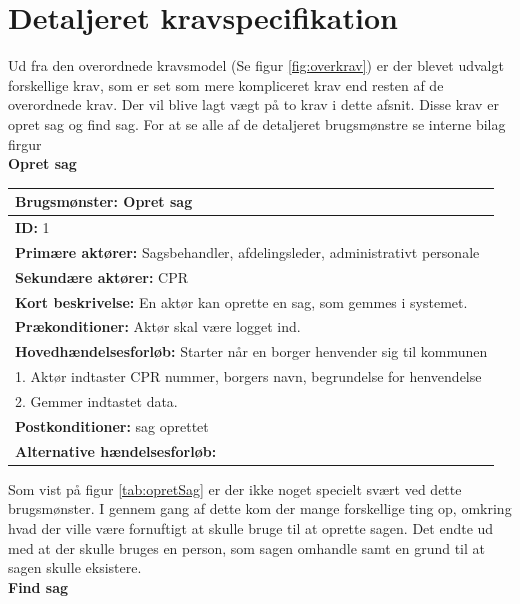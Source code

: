 \section{Detaljeret kravspecifikation}
Ud fra den overordnede kravsmodel (Se figur \ref{fig:overkrav}) er der blevet udvalgt forskellige krav, som er set som mere kompliceret krav end resten af de overordnede krav. Der vil blive lagt vægt på to krav i dette afsnit. Disse krav er opret sag og find sag. For at se alle af de detaljeret brugsmønstre se interne bilag firgur \\
\textbf{Opret sag} \\
\begin{center} \label{tab:opretSag}
\begin{longtable}{|p{18cm}|}
\hline
\textbf{Brugsmønster: }Opret sag \\
\hline
\textbf{ID: }1 \\
\hline
\textbf{Primære aktører: }Sagsbehandler, afdelingsleder, administrativt personale\\
\hline
\textbf{Sekundære aktører: }CPR\\
\hline
\textbf{Kort beskrivelse: }En aktør kan oprette en sag, som gemmes i systemet. \\
\hline
\textbf{Prækonditioner: }Aktør skal være logget ind.\\
\hline
\textbf{Hovedhændelsesforløb: }\newline 
Starter når en borger henvender sig til kommunen \\
1. Aktør indtaster CPR nummer, borgers navn, begrundelse for henvendelse \\
2. Gemmer indtastet data.	
\\
\hline
\textbf{Postkonditioner: }sag oprettet\\
\hline
\textbf{Alternative hændelsesforløb: }\\
\hline
\end{longtable}
\end{center}
Som vist på figur \ref{tab:opretSag} er der ikke noget specielt svært ved dette brugsmønster. I gennem gang af dette kom der mange forskellige ting op, omkring hvad der ville være fornuftigt at skulle bruge til at oprette sagen. Det endte ud med at der skulle bruges en person, som sagen omhandle samt en grund til at sagen skulle eksistere. \\
\textbf{Find sag} \\
